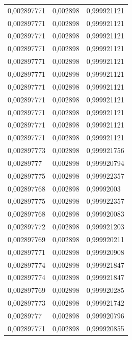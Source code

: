 \begin{center}
\begin{longtable}{|l|l|l|}
0,002897771        & 0,002898              & 0,999921121  \\
0,002897771        & 0,002898              & 0,999921121  \\
0,002897771        & 0,002898              & 0,999921121  \\
0,002897771        & 0,002898              & 0,999921121  \\
0,002897771        & 0,002898              & 0,999921121  \\
0,002897771        & 0,002898              & 0,999921121  \\
0,002897771        & 0,002898              & 0,999921121  \\
0,002897771        & 0,002898              & 0,999921121  \\
0,002897771        & 0,002898              & 0,999921121  \\
0,002897771        & 0,002898              & 0,999921121  \\
0,002897771        & 0,002898              & 0,999921121  \\
0,002897773        & 0,002898              & 0,999921756  \\
0,00289777         & 0,002898              & 0,999920794  \\
0,002897775        & 0,002898              & 0,999922357  \\
0,002897768        & 0,002898              & 0,99992003   \\
0,002897775        & 0,002898              & 0,999922357  \\
0,002897768        & 0,002898              & 0,999920083  \\
0,002897772        & 0,002898              & 0,999921203  \\
0,002897769        & 0,002898              & 0,999920211  \\
0,002897771        & 0,002898              & 0,999920908  \\
0,002897774        & 0,002898              & 0,999921847  \\
0,002897774        & 0,002898              & 0,999921847  \\
0,002897769        & 0,002898              & 0,999920285  \\
0,002897773        & 0,002898              & 0,999921742  \\
0,00289777         & 0,002898              & 0,999920796  \\
0,002897771        & 0,002898              & 0,999920855  \\

\end{longtable}
\end{center}
